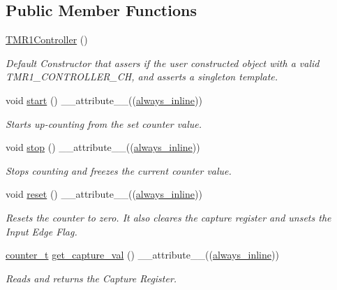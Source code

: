 \subsection*{Public Member Functions}
\begin{DoxyCompactItemize}
\item 
\hyperlink{classTMR1Controller_aebc677e795f673c6520d5a03eb6aa4f2}{T\+M\+R1\+Controller} ()
\begin{DoxyCompactList}\small\item\em Default Constructor that assers if the user constructed object with a valid {\itshape T\+M\+R1\+\_\+\+C\+O\+N\+T\+R\+O\+L\+L\+E\+R\+\_\+\+CH}, and asserts a singleton template. \end{DoxyCompactList}\item 
void \hyperlink{classTMR1Controller_a67bc04f0648176a681f6ac01ea483db9}{start} () \+\_\+\+\_\+attribute\+\_\+\+\_\+((\hyperlink{classTMR1Controller_adce8e8a496510485a88ccc5b88595672}{always\+\_\+inline}))
\begin{DoxyCompactList}\small\item\em Starts up-\/counting from the set counter value. \end{DoxyCompactList}\item 
void \hyperlink{classTMR1Controller_afcb0ea27107bfbe50b9dcbd54207dd00}{stop} () \+\_\+\+\_\+attribute\+\_\+\+\_\+((\hyperlink{classTMR1Controller_adce8e8a496510485a88ccc5b88595672}{always\+\_\+inline}))
\begin{DoxyCompactList}\small\item\em Stops counting and freezes the current counter value. \end{DoxyCompactList}\item 
void \hyperlink{classTMR1Controller_adf3746ffd24c5b55abff4fa18e05f6b3}{reset} () \+\_\+\+\_\+attribute\+\_\+\+\_\+((\hyperlink{classTMR1Controller_adce8e8a496510485a88ccc5b88595672}{always\+\_\+inline}))
\begin{DoxyCompactList}\small\item\em Resets the counter to zero. It also cleares the capture register and unsets the Input Edge Flag. \end{DoxyCompactList}\item 
\hyperlink{types_8hpp_a22f279793847eba127de149437848c48}{counter\+\_\+t} \hyperlink{classTMR1Controller_a3d07eed72365e7a7b44fadefb23b9ba6}{get\+\_\+capture\+\_\+val} () \+\_\+\+\_\+attribute\+\_\+\+\_\+((\hyperlink{classTMR1Controller_adce8e8a496510485a88ccc5b88595672}{always\+\_\+inline}))
\begin{DoxyCompactList}\small\item\em Reads and returns the Capture Register. \end{DoxyCompactList}\item 

\end{DoxyCompactItemize}
